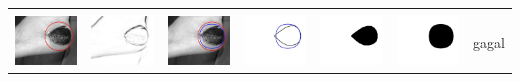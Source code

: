 \begin{table}[H]
\begin{tabular}{|m{0.7in}|m{0.7in}|m{0.7in}|m{0.7in}|m{0.7in}|m{0.7in}|m{0.7in}|}
		&  &  & & & &  \\
		\includegraphics[width=0.7in]{dataset/dataset_3/luka_hitam/ready/2_integer_init.jpg}&
		\includegraphics[width=0.7in]{dataset/dataset_3/luka_hitam/ready/2_integer_ext.jpg}&
		\includegraphics[width=0.7in]{dataset/dataset_3/luka_hitam/ready/2_integer_result.jpg}&
		\includegraphics[width=0.7in]{dataset/dataset_3/luka_hitam/ready/2_gt_r_integer.jpg}&
		\includegraphics[width=0.7in]{dataset/dataset_3/luka_hitam/ready/2_r.jpg}&
		\includegraphics[width=0.7in]{dataset/dataset_3/luka_hitam/ready/2_integer_r.jpg}&
		gagal\\
		\hline
		

\end{tabular}
\end{table}
